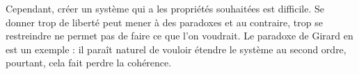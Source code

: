 \documentclass[a4paper,12pt]{article}
\theoremstyle{plain}
\begin{document}
Cependant, créer un système qui a les propriétés souhaitées est difficile. Se donner trop de liberté peut mener à des paradoxes et au contraire, trop se restreindre ne permet pas de faire ce que l'on voudrait. Le paradoxe de Girard en est un exemple : il paraît naturel de vouloir étendre le système au second ordre, pourtant, cela fait perdre la cohérence.

\nocite{proofstypes} \nocite{Lambda-calc} \nocite{paradox}




\end{document}
